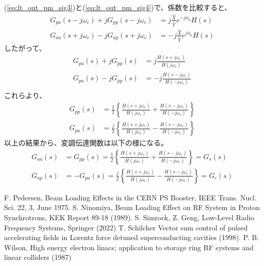 \documentclass[book]{jlreq}
\begin{document}
%
(\ref{eq:lt_out_pm_sig3})と(\ref{eq:lt_out_pm_sig4})で、係数を比較すると、
%
\begin{equation}
    \begin{split}
        G_{pa}(s-j\omega_c) + j G_{pp}(s-j\omega_c) &= j \frac{\hat{X}}{\hat{Y}}e^{-j\phi_0}H(s) \\
        G_{aa}(s+j\omega_c) - j G_{ap}(s+j\omega_c) &= -j \frac{\hat{X}}{\hat{Y}}e^{j\phi_0}H(s) 
    \end{split}
\end{equation}
%
したがって、
%
\begin{equation}
    \begin{split}
        G_{pa}(s) + j G_{pp}(s) &= j \frac{H(s+j\omega_c)}{H(j\omega_c)} \\
        G_{pa}(s) - j G_{pp}(s) &= -j \frac{H(s-j\omega_c)}{H(-j\omega_c)} \\
    \end{split}
\end{equation}
%
これらより、
%
\begin{equation}
    \begin{split}
        G_{pp}(s) &= \frac{1}{2}\left\{\frac{H(s+j\omega_c)}{H(j\omega_c)} + \frac{H(s-j\omega_c)}{H(-j\omega_c)}\right\} \\
        G_{pa}(s) &= \frac{j}{2}\left\{\frac{H(s+j\omega_c)}{H(j\omega_c)} - \frac{H(s-j\omega_c)}{H(-j\omega_c)}\right\}
    \end{split}
\end{equation}
%
以上の結果から、変調伝達関数は以下の様になる。
%
\begin{equation}
    \begin{split}
        G_{aa}(s) &= G_{pp}(s) 
        = \frac{1}{2}\left\{\frac{H(s+j\omega_c)}{H(j\omega_c)} + \frac{H(s-j\omega_c)}{H(-j\omega_c)}\right\} = G_s(s)\\
        G_{ap}(s) &= -G_{pa}(s) 
        = \frac{j}{2}\left\{\frac{H(s+j\omega_c)}{H(j\omega_c)} - \frac{H(s-j\omega_c)}{H(-j\omega_c)}\right\} = G_c(s)
    \end{split}
\end{equation}
%
\begin{thebibliography}{9}
    F. Pedersen, Beam Loading Effects in the CERN PS Booster, IEEE Trans. Nucl. Sci. 22, 3, June 1975.
    S. Ninomiya, Beam Loading Effect on RF System in Proton Synchrotrons, KEK Report 89-18 (1989).
    S. Simrock, Z. Geng, Low-Level Radio Frequency Systems, Springer (2022)
    T. Schilcher Vector sum control of pulsed accelerating fields in Lorentz force detuned superconducting cavities (1998).
    P. B. Wilson, High energy electron linacs; application to storage ring RF systems and linear colliders (1987)
\end{thebibliography}
%
%
\end{document}
